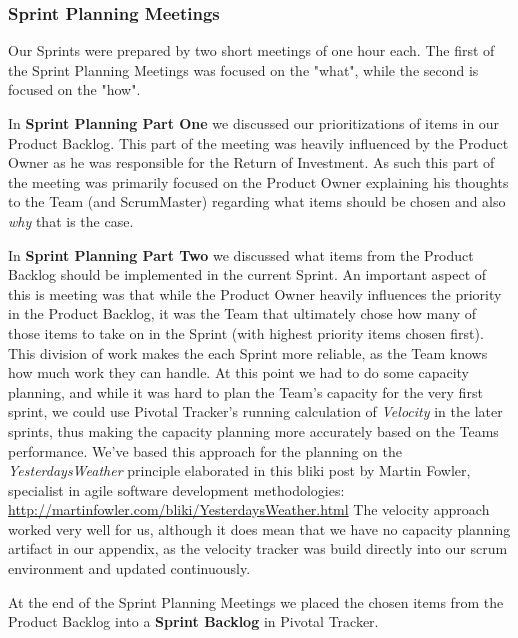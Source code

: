 \subsubsection{Sprint Planning Meetings} 
Our Sprints were prepared by two short meetings of one hour each. The first of the Sprint Planning Meetings was focused on the "what", while the second is focused on the "how".

In \textbf{Sprint Planning Part One}  we discussed our prioritizations of items in our Product Backlog. This part of the meeting was heavily influenced by the Product Owner as he was responsible for the Return of Investment. As such this part of the meeting was primarily focused on the Product Owner explaining his thoughts to the Team (and ScrumMaster) regarding what items should be chosen and also \textit{why} that is the case.

In \textbf{Sprint Planning Part Two} we discussed what items from the Product Backlog should be implemented in the current Sprint. An important aspect of this is meeting was that while the Product Owner heavily influences the priority in the Product Backlog, it was the Team that ultimately chose how many of those items to take on in the Sprint (with highest priority items chosen first). This division of work makes the each Sprint more reliable, as the Team knows how much work they can handle. At this point we had to do some capacity planning, and while it was hard to plan the Team's capacity for the very first sprint, we could use Pivotal Tracker's running calculation of \textit{Velocity} in the later sprints, thus making the capacity planning more accurately based on the Teams performance. We've based this approach for the planning on the \textit{YesterdaysWeather} principle elaborated in this bliki post by Martin Fowler, specialist in agile software development methodologies: \url{http://martinfowler.com/bliki/YesterdaysWeather.html}
The velocity approach worked very well for us, although it does mean that we have no capacity planning artifact in our appendix, as the velocity tracker was build directly into our scrum environment and updated continuously.

 At the end of the Sprint Planning Meetings we placed the chosen items from the Product Backlog into a \textbf{Sprint Backlog} in Pivotal Tracker.